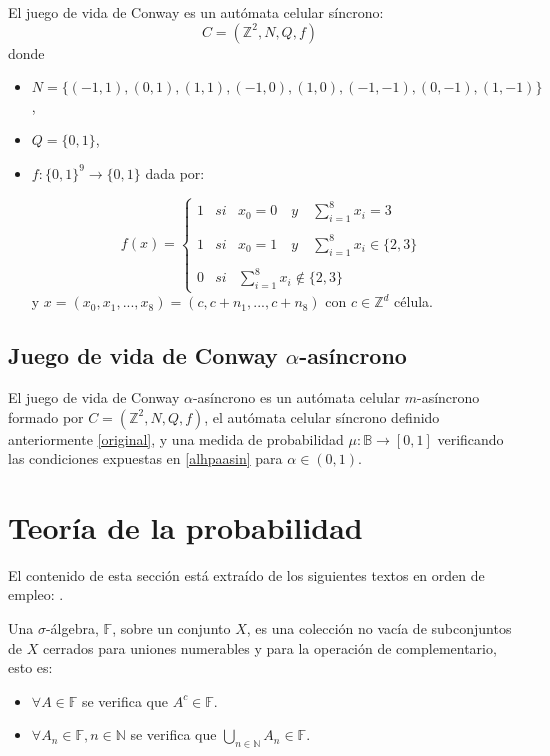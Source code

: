 \documentclass[../proyecto.tex]{memoir}
\begin{document}
\begin{defi}  \label{original}
El juego de vida de Conway es un autómata celular síncrono: $$
C = (\mathds{Z}^{2}, N, Q, f)
$$
donde
\begin{itemize}
\item $N=\{(-1, 1), (0, 1), (1, 1), (-1, 0), (1, 0), (-1,-1), (0,-1), (1,-1) \}$,
\item $Q=\{0,1\}$,
\item $f:\{0,1\}^{9} \rightarrow \{0,1\} $ dada por:

\begin{equation} \label{trans}
f(x)= \left\{ \begin{array}{lcc}
             1 &   si  & x_{0}=0 \quad y \quad \sum_{i=1}^{8} x_i = 3 \\
             \\ 1 & si & x_{0}=1 \quad y \quad \sum_{i=1}^{8} x_i \in \{2 ,3\} \\
             \\ 0 &  si  & \sum_{i=1}^{8} x_i \notin \{2, 3\} \
             \end{array}
   \right. 
\end{equation}
y $x = (x_{0}, x_{1}, ...,x_{8}) = (c,c+n_{1},...,c+n_{8})$ con $c \in \mathds{Z} ^{d}$ célula.

\end{itemize}
\end{defi}

\subsection{Juego de vida de Conway $\alpha$-asíncrono}
\begin{defi}
El juego de vida de Conway $\alpha$-asíncrono es un autómata celular $m$-asíncrono formado por $C=(\mathds{Z}^{2}, N, Q, f)$, el autómata celular síncrono definido anteriormente \ref{original}, y una medida de probabilidad $\mu: \mathds{B} \rightarrow [0,1]$ verificando las condiciones expuestas en \ref{alhpaasin} para $\alpha \in (0,1)$. 
\end{defi}


\section{Teoría de la probabilidad}

El contenido de esta sección está extraído de los siguientes textos en orden de empleo: \cite{elLibro, grandesNumeros, loeve}. 

\begin{defi}
Una $\sigma$-álgebra, $\mathds{F}$, sobre un conjunto $X$, es una colección no vacía de subconjuntos de $X$ cerrados para uniones numerables y para la operación de complementario, esto es:
\begin{itemize}
\item $\forall A \in \mathds{F}$ se verifica que $A^{c} \in \mathds{F}$.
\item $ \forall A_{n} \in \mathds{F}, n \in \mathds{N} $ se verifica que $\bigcup _{n \in \mathds{N}} A_{n} \in \mathds{F}$.
\end{itemize}
\end{defi}
\end{document}
